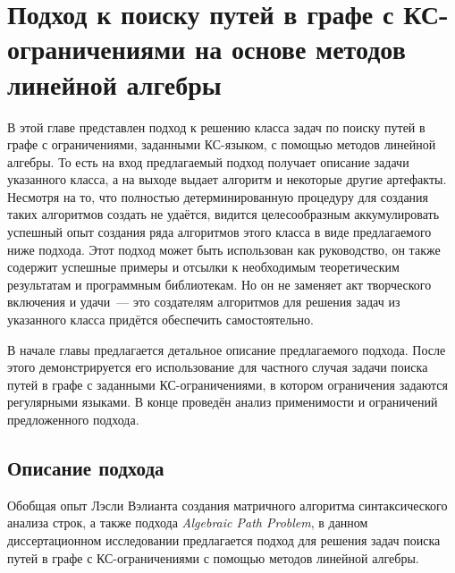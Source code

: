 \chapter{Подход к поиску путей в графе с  КС-ограничениями на основе методов линейной алгебры}\label{ch:ch2}

В этой главе представлен подход к решению класса задач по поиску путей в графе с ограничениями, заданными КС-языком, с помощью методов линейной алгебры. То есть на вход предлагаемый подход получает описание задачи указанного класса, а на выходе выдает алгоритм и некоторые другие артефакты. Несмотря на то, что полностью детерминированную процедуру для создания таких алгоритмов создать не удаётся, видится целесообразным аккумулировать успешный опыт создания ряда алгоритмов этого класса в виде предлагаемого ниже подхода. Этот подход может быть использован как руководство, он также содержит успешные примеры и отсылки к необходимым теоретическим результатам и программным библиотекам. Но он не заменяет акт творческого включения и удачи~--- это создателям алгоритмов для решения задач из указанного класса придётся обеспечить самостоятельно.    

В начале главы предлагается детальное описание предлагаемого подхода. После этого демонстрируется его использование для частного случая задачи поиска путей в графе с заданными КС-ограничениями, в котором ограничения задаются регулярными языками. В конце проведён анализ применимости и ограничений предложенного подхода.

\section{Описание подхода}
Обобщая опыт Лэсли Вэлианта создания матричного алгоритма синтаксического анализа строк, а также подхода \textit{Algebraic Path Problem}, в данном диссертационном исследовании предлагается подход для решения задач поиска путей в графе с КС-ограничениями с помощью методов линейной алгебры.

